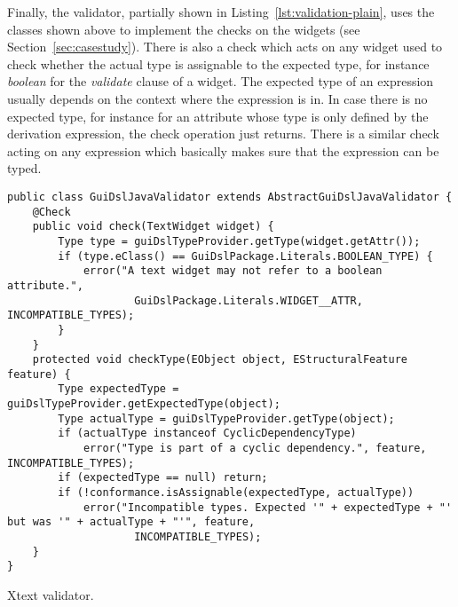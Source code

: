 Finally, the validator, partially shown in Listing~\ref{lst:validation-plain},
uses the classes shown above to implement the checks on the widgets (see
Section~\ref{sec:casestudy}).
There is also a check which acts on any widget used to check whether the actual
type is assignable to the expected type, for instance \emph{boolean} for the
\emph{validate} clause of a widget. The expected type of an expression usually
depends on the context where the expression is in.
In case there is no expected type, for instance for an attribute whose type is
only defined by the derivation expression, the check operation just returns.
There is a similar check acting on any expression which basically makes sure
that the expression can be typed.

%

\begin{listing}[tb]
\begin{lstlisting} 
public class GuiDslJavaValidator extends AbstractGuiDslJavaValidator {
	@Check
	public void check(TextWidget widget) {
		Type type = guiDslTypeProvider.getType(widget.getAttr());
		if (type.eClass() == GuiDslPackage.Literals.BOOLEAN_TYPE) {
			error("A text widget may not refer to a boolean attribute.",
					GuiDslPackage.Literals.WIDGET__ATTR, INCOMPATIBLE_TYPES);
		}
	}
	protected void checkType(EObject object, EStructuralFeature feature) {
		Type expectedType = guiDslTypeProvider.getExpectedType(object);
		Type actualType = guiDslTypeProvider.getType(object);
		if (actualType instanceof CyclicDependencyType)
			error("Type is part of a cyclic dependency.", feature, INCOMPATIBLE_TYPES);
		if (expectedType == null) return;
		if (!conformance.isAssignable(expectedType, actualType))
			error("Incompatible types. Expected '" + expectedType + "' but was '" + actualType + "'", feature,
					INCOMPATIBLE_TYPES);
	}
}
\end{lstlisting}
\caption{Xtext validator.}
\label{lst:validation-plain}
\end{listing}


%


